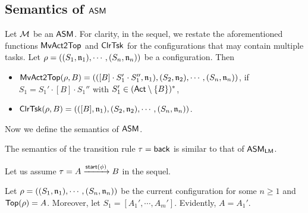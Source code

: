 
\subsection{Semantics of $\textsf{ASM}$}

Let ${\mathcal{M} }$ be an $\textsf{ASM}$. For clarity, in the sequel, we restate the aforementioned functions $\mathsf{MvAct2Top}$ and $\mathsf{ClrTsk}$ for the configurations that may contain multiple tasks. 
Let $\rho = ((S_1,\mathfrak{n}_1),\cdots, (S_n,\mathfrak{n}_n))$ be a configuration.
Then
\begin{itemize}
	\item $\mathsf{MvAct2Top}(\rho, B) = (([B]\cdot S_1'\cdot S_1'',\mathfrak{n}_1), (S_2,\mathfrak{n}_2), \cdots, (S_n,\mathfrak{n}_n))$, if $S_1=S_1'\cdot[B]\cdot S_1''$ with $S_1'\in ({\sf Act}\setminus\{B\})^*$,
	\item $\mathsf{ClrTsk}(\rho, B) = (([B],\mathfrak{n}_1), (S_2,\mathfrak{n}_2), \cdots, (S_n,\mathfrak{n}_n))$.
\end{itemize}
Now we define the semantics of $\textsf{ASM}$. 

The semantics of the transition rule $\tau = {\mathsf{back} }$ is similar to that of $\textsf{ASM}_\textsf{LM}$.

Let us  assume $\tau = A\xrightarrow[]{{\mathsf{start} }(\phi)}B$ in the sequel.

Let $\rho = ((S_1,\mathfrak{n}_1),\cdots,(S_n,\mathfrak{n}_n))$ be the current configuration for some $n \ge 1$ and $\mathsf{Top}(\rho) = A$. Moreover, let $S_1 = [A_1',\cdots,A_m']$. Evidently, $A = A_1'$.

